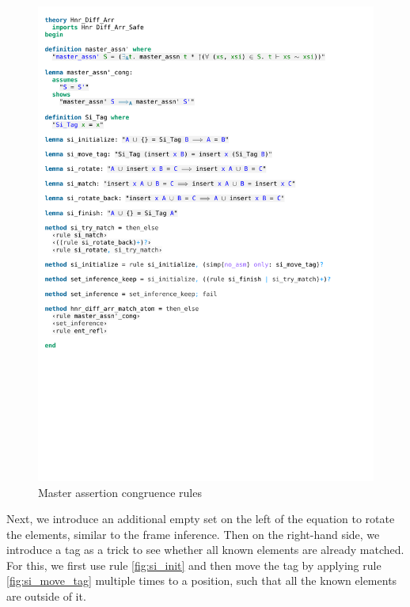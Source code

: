\begin{figure}[htpb]
    \includegraphics[trim={0 23,4cm 0 3,9cm}, clip, width=1.00\textwidth]{figures/Theory_Hnr_Diff_Arr_SI.pdf}
    \caption[Master assertion congruence rule]{Master assertion congruence rules}
    \label{fig:si_cong}
\end{figure}

\noindent Next, we introduce an additional empty set on the left of the equation to rotate the elements, similar to the frame inference. Then on the right-hand side, we introduce a tag as a trick to see whether all known elements are already matched. For this, we first use rule \autoref{fig:si_init} and then move the tag by applying rule \autoref{fig:si_move_tag} multiple times to a position, such that all the known elements are outside of it.

